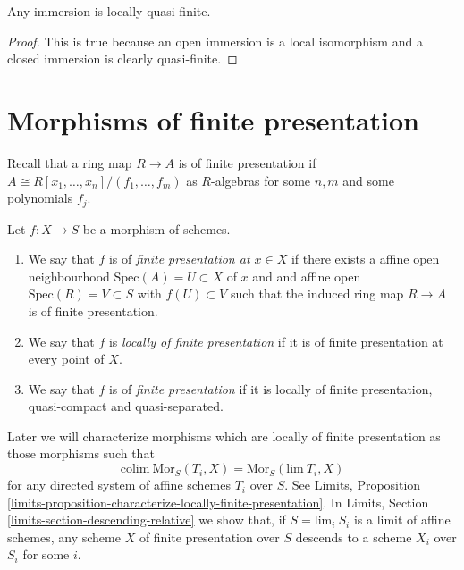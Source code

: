 \begin{lemma}
\label{lemma-immersion-locally-quasi-finite}
Any immersion is locally quasi-finite.
\end{lemma}

\begin{proof}
This is true because an open immersion is a local isomorphism
and a closed immersion is clearly quasi-finite.
\end{proof}













\section{Morphisms of finite presentation}
\label{section-finite-presentation}

\noindent
Recall that a ring map $R \to A$ is of finite presentation if
$A \cong R[x_1, \ldots, x_n]/(f_1, \ldots, f_m)$ as $R$-algebras
for some $n, m$ and some polynomials $f_j$.

\begin{definition}
\label{definition-finite-presentation}
Let $f : X \to S$ be a morphism of schemes.
\begin{enumerate}
\item We say that $f$ is of {\it finite presentation at $x \in X$} if
there exists a affine open neighbourhood $\text{Spec}(A) = U \subset X$
of $x$ and and affine open $\text{Spec}(R) = V \subset S$
with $f(U) \subset V$ such that the induced ring map
$R \to A$ is of finite presentation.
\item We say that $f$ is {\it locally of finite presentation} if it is
of finite presentation at every point of $X$.
\item We say that $f$ is of {\it finite presentation} if it is locally of
finite presentation, quasi-compact and quasi-separated.
\end{enumerate}
\end{definition}

\noindent
Later we will characterize morphisms which are
locally of finite presentation as those morphisms such that
$$
\text{colim}\ \text{Mor}_S(T_i, X) = \text{Mor}_S(\text{lim}\ T_i, X)
$$
for any directed system of affine schemes $T_i$ over $S$. See
Limits,
Proposition \ref{limits-proposition-characterize-locally-finite-presentation}.
In Limits, Section \ref{limits-section-descending-relative} we show
that, if $S = \text{lim}_i\ S_i$ is a limit of affine schemes,
any scheme $X$ of finite presentation over $S$ descends to a scheme
$X_i$ over $S_i$ for some $i$.

